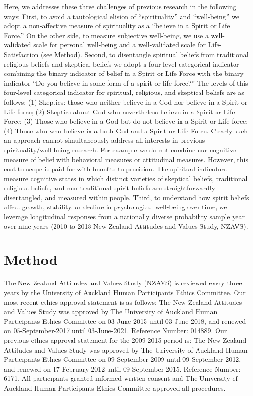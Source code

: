\documentclass[
  english,
  man,floatsintext]{apa6}
\begin{document}
Here, we addresses these three challenges of previous research in the following ways: First, to avoid a tautological elision of \enquote{spirituality} and \enquote{well-being} we adopt a non-affective measure of spirituality as a \enquote{believe in a Spirit or Life Force.} On the other side, to measure subjective well-being, we use a well-validated scale for personal well-being and a well-validated scale for Life-Satisfaction (see Method). Second, to disentangle spiritual beliefs from traditional religious beliefs and skeptical beliefs we adopt a four-level categorical indicator combining the binary indicator of belief in a Spirit or Life Force with the binary indicator \enquote{Do you believe in some form of a spirit or life force?} The levels of this four-level categorical indicator for spiritual, religious, and skeptical beliefs are as follows: (1) Skeptics: those who neither believe in a God nor believe in a Spirit or Life force; (2) Skeptics about God who nevertheless believe in a Spirit or Life Force; (3) Those who believe in a God but do not believe in a Spirit or Life force; (4) Those who who believe in a both God and a Spirit or Life Force. Clearly such an approach cannot simultaneously address all interests in previous spirituality/well-being research. For example we do not combine our cognitive measure of belief with behavioral measures or attitudinal measures. However, this cost to scope is paid for with benefits to precision. The spiritual indicators measure cognitive states in which distinct varieties of skeptical beliefs, traditional religious beliefs, and non-traditional spirit beliefs are straightforwardly disentangled, and measured within people. Third, to understand how spirit beliefs affect growth, stability, or decline in psychological well-being over time, we leverage longitudinal responses from a nationally diverse probability sample year over nine years (2010 to 2018 New Zealand Attitudes and Values Study, NZAVS).

\hypertarget{method}{%
\section{Method}\label{method}}

The New Zealand Attitudes and Values Study (NZAVS) is reviewed every three years by the University of Auckland Human Participants Ethics Committee. Our most recent ethics approval statement is as follows: The New Zealand Attitudes and Values Study was approved by The University of Auckland Human Participants Ethics Committee on 03-June-2015 until 03-June-2018, and renewed on 05-September-2017 until 03-June-2021. Reference Number: 014889. Our previous ethics approval statement for the 2009-2015 period is: The New Zealand Attitudes and Values Study was approved by The University of Auckland Human Participants Ethics Committee on 09-September-2009 until 09-September-2012, and renewed on 17-February-2012 until 09-September-2015. Reference Number: 6171. All participants granted informed written consent and The University of Auckland Human Participants Ethics Committee approved all procedures.
\end{document}
